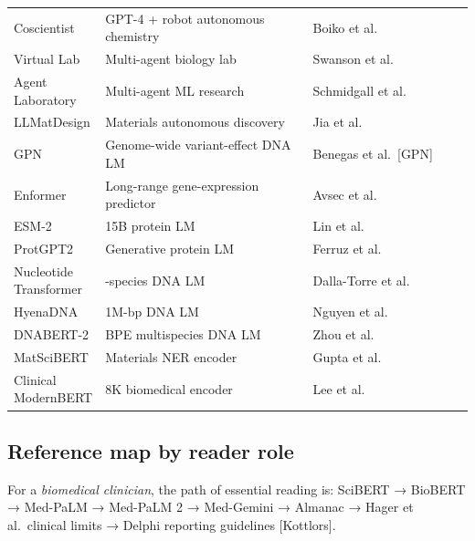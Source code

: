 \documentclass{article}
\begin{document}
\begin{table}[t]
\begin{tabular}{>{\raggedright\arraybackslash}p{0.1467\linewidth}
  >{\raggedright\arraybackslash}p{0.4800\linewidth}
  >{\raggedright\arraybackslash}p{0.3733\linewidth}}
Coscientist & GPT-4 + robot autonomous chemistry & Boiko et al.~\cite{boiko2023nature6242023} \\
Virtual Lab & Multi-agent biology lab & Swanson et al.~\cite{swanson2024thevirtuallabaiage} \\
Agent Laboratory & Multi-agent ML research & Schmidgall et al.~\cite{schmidgall2025agentlaboratoryusi} \\
LLMatDesign & Materials autonomous discovery & Jia et al.~\cite{jia2024arxiv2406131632024} \\
GPN & Genome-wide variant-effect DNA LM & Benegas et al.~{[}GPN{]} \\
Enformer & Long-range gene-expression predictor & Avsec et al.~\cite{avsec2021effectivegeneexpre} \\
ESM-2 & 15B protein LM & Lin et al.~\cite{lin2022evolutionaryscalep} \\
ProtGPT2 & Generative protein LM & Ferruz et al.~\cite{ferruz2022naturecommunicatio} \\
Nucleotide Transformer & 850-species DNA LM & Dalla-Torre et al.~\cite{dallatorre2024nucleotidetransfor} \\
HyenaDNA & 1M-bp DNA LM & Nguyen et al.~\cite{nguyen2023hyenadnalongrangeg} \\
DNABERT-2 & BPE multispecies DNA LM & Zhou et al.~\cite{zhou2023arxiv2306150062023} \\
MatSciBERT & Materials NER encoder & Gupta et al.~\cite{gupta2022matscibertamateria} \\
Clinical ModernBERT & 8K biomedical encoder & Lee et al.~\cite{lee2025arxiv2504039642025} \\
\end{tabular}
\end{table}

\subsection{Reference map by reader role}\label{reference-map-by-reader-role}

For a \emph{biomedical clinician}, the path of essential reading is: SciBERT \cite{beltagy2019arxiv1903106762019} → BioBERT \cite{lee2019bioinformatics2019} → Med-PaLM \cite{singhal2023largelanguagemodel} → Med-PaLM 2 \cite{singhal2025towardexpertlevelm} → Med-Gemini \cite{yang2024advancingmultimoda} → Almanac \cite{zakka2024almanacretrievalau} → Hager et al.~clinical limits \cite{hager2024evaluationandmitig} → Delphi reporting guidelines {[}Kottlors{]}.
\end{document}
